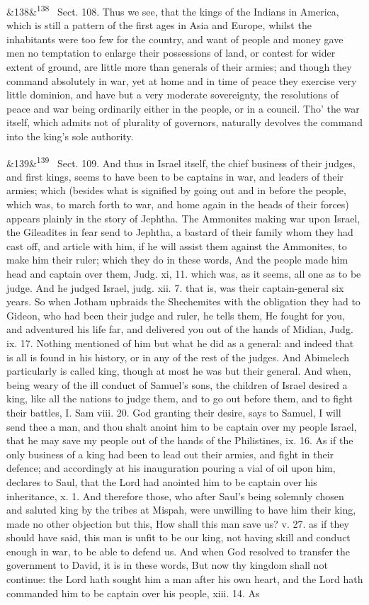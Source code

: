 \documentclass[12pt]{article}
\newcommand{\para}[1][]{\par\noindent\ifx&#1&\else\textsuperscript{\footnotesize #1}~\fi}
\begin{document}
\para[138] Sect. 108. Thus we see, that the kings of the Indians in America, which is still a pattern of the first ages in Asia and Europe, whilst the inhabitants were too few for the country, and want of people and money gave men no temptation to enlarge their possessions of land, or contest for wider extent of ground, are little more than generals of their armies; and though they command absolutely in war, yet at home and in time of peace they exercise very little dominion, and have but a very moderate sovereignty, the resolutions of peace and war being ordinarily either in the people, or in a council. Tho' the war itself, which admits not of plurality of governors, naturally devolves the command into the king's sole authority.

\para[139] Sect. 109. And thus in Israel itself, the chief business of their judges, and first kings, seems to have been to be captains in war, and leaders of their armies; which (besides what is signified by going out and in before the people, which was, to march forth to war, and home again in the heads of their forces) appears plainly in the story of Jephtha. The Ammonites making war upon Israel, the Gileadites in fear send to Jephtha, a bastard of their family whom they had cast off, and article with him, if he will assist them against the Ammonites, to make him their ruler; which they do in these words, And the people made him head and captain over them, Judg. xi, 11. which was, as it seems, all one as to be judge. And he judged Israel, judg. xii. 7. that is, was their captain-general six years. So when Jotham upbraids the Shechemites with the obligation they had to Gideon, who had been their judge and ruler, he tells them, He fought for you, and adventured his life far, and delivered you out of the hands of Midian, Judg. ix. 17. Nothing mentioned of him but what he did as a general: and indeed that is all is found in his history, or in any of the rest of the judges. And Abimelech particularly is called king, though at most he was but their general. And when, being weary of the ill conduct of Samuel's sons, the children of Israel desired a king, like all the nations to judge them, and to go out before them, and to fight their battles, I. Sam viii. 20. God granting their desire, says to Samuel, I will send thee a man, and thou shalt anoint him to be captain over my people Israel, that he may save my people out of the hands of the Philistines, ix. 16. As if the only business of a king had been to lead out their armies, and fight in their defence; and accordingly at his inauguration pouring a vial of oil upon him, declares to Saul, that the Lord had anointed him to be captain over his inheritance, x. 1. And therefore those, who after Saul's being solemnly chosen and saluted king by the tribes at Mispah, were unwilling to have him their king, made no other objection but this, How shall this man save us? v. 27. as if they should have said, this man is unfit to be our king, not having skill and conduct enough in war, to be able to defend us. And when God resolved to transfer the government to David, it is in these words, But now thy kingdom shall not continue: the Lord hath sought him a man after his own heart, and the Lord hath commanded him to be captain over his people, xiii. 14. As 
\end{document}
